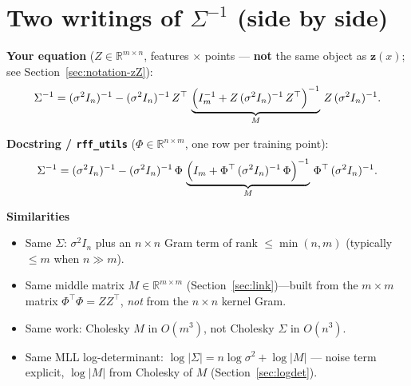 \documentclass[11pt]{article}
\newcommand{\noise}{\sigma^2}
\newcommand{\Sig}{\Sigma}
\newcommand{\Ph}{\Phi}
\newcommand{\Zmat}{Z}
\begin{document}
\section{Two writings of $\Sig^{-1}$ (side by side)}

\begin{diffbox}
\textbf{Your equation} ($\Zmat\in\mathbb{R}^{m\times n}$, features $\times$ points --- \textbf{not} the same object as $\mathbf z(x)$; see Section~\ref{sec:notation-zZ}):
\begin{equation}
  \label{eq:user}
  \Sig^{-1}
  = (\noise I_n)^{-1}
  - (\noise I_n)^{-1}\,
    \Zmat^{\top}\,
    \underbrace{\Bigl(I_m^{-1} + \Zmat\,(\noise I_n)^{-1}\,\Zmat^{\top}\Bigr)^{-1}}_{M}\,
    \Zmat\,
    (\noise I_n)^{-1}.
\end{equation}
\end{diffbox}

\begin{diffbox}
\textbf{Docstring / \texttt{rff\_utils}} ($\Ph\in\mathbb{R}^{n\times m}$, one row per training point):
\begin{equation}
  \label{eq:code}
  \Sig^{-1}
  = (\noise I_n)^{-1}
  - (\noise I_n)^{-1}\,
    \Ph\,
    \underbrace{\Bigl(I_m + \Ph^{\top}\,(\noise I_n)^{-1}\,\Ph\Bigr)^{-1}}_{M}\,
    \Ph^{\top}\,
    (\noise I_n)^{-1}.
\end{equation}
\end{diffbox}

\begin{samebox}
\textbf{Similarities}
\begin{itemize}
  \item Same $\Sig$: $\noise I_n$ plus an $n\times n$ Gram term of rank $\le \min(n,m)$ (typically $\le m$ when $n\gg m$).
  \item Same middle matrix $M\in\mathbb{R}^{m\times m}$ (Section~\ref{sec:link})---built from the $m\times m$ matrix $\Ph^{\top}\Ph=\Zmat\Zmat^{\top}$, \emph{not} from the $n\times n$ kernel Gram.
  \item Same work: Cholesky $M$ in $O(m^3)$, not Cholesky $\Sig$ in $O(n^3)$.
  \item Same MLL log-determinant: $\log|\Sig| = n\log\noise + \log|M|$ --- noise term explicit, $\log|M|$ from Cholesky of $M$ (Section~\ref{sec:logdet}).
\end{itemize}
\end{samebox}
\end{document}

